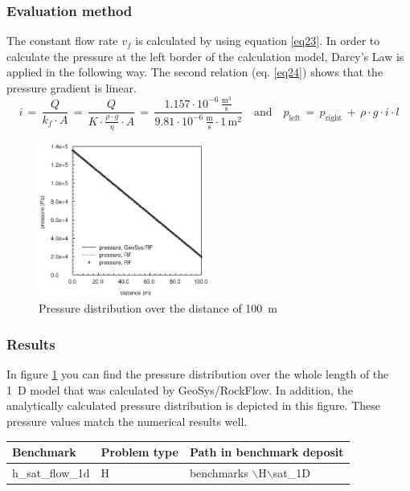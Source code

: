 \subsubsection*{Evaluation method}

The constant flow rate $v_f$ is calculated by using equation \ref{eq23}. In order to calculate the pressure at the left border of the calculation model, Darcy's Law is applied in the following way. The second relation (eq. \ref{eq24}) shows that the pressure gradient is linear.
\begin{equation}
i\,=\,\frac{Q}{k_f\cdot A}\,=\,
\frac{Q}{K\cdot\frac{\displaystyle{\rho\cdot g}}{\displaystyle{\eta}}\cdot A}\,=\,
\frac{1.157\cdot 10^{-6}\,\frac{\displaystyle{\mathrm{m}^3}}{\displaystyle{\mathrm{s}}}}
{9.81\cdot 10^{-6}\,\frac{\displaystyle{\mathrm{m}}}{\displaystyle{\mathrm{s}}}\cdot 1\,\mathrm{m}^2}
\quad\mathrm{and}\quad
p_{\mathrm{left}}\,=\,p_{\mathrm{right}}\,+\,\rho\cdot g\cdot i\cdot l
\label{eq24}
\end{equation}

\begin{figure}[htbp]
\centering
\includegraphics[width=0.5\textwidth]{H_GW/figures/fig22.eps}
\caption{Pressure distribution over the distance of 100~m}
\label{fig22}
\end{figure}

\subsubsection*{Results}

In figure \ref{fig22} you can find the pressure distribution over the whole length of the 1~D model that was calculated by GeoSys/RockFlow. In addition, the analytically calculated pressure distribution is depicted in this figure. These pressure values match the numerical results well.

\begin{tabular}{|l|l|l|}
\hline
Benchmark & Problem type	& Path in benchmark deposit \\
\hline	
h\_sat\_flow\_1d	& H	& benchmarks $\backslash$H$\backslash$sat\_1D \\
\hline	
\end{tabular}
